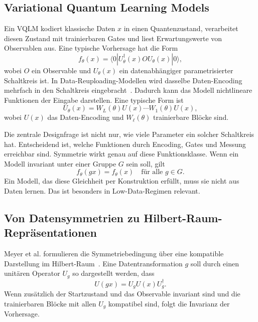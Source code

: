\subsection{Variational Quantum Learning Models}\label{subsec:vqlm}

Ein VQLM kodiert klassische Daten $x$ in einen Quantenzustand, verarbeitet diesen Zustand mit trainierbaren Gates und liest Erwartungswerte von Observablen aus. Eine typische Vorhersage hat die Form
\begin{equation}
f_\theta(x)=
\langle 0|U^\dagger_\theta(x) O U_\theta(x)|0\rangle,
\label{eq:vqlm}
\end{equation}
wobei $O$ ein Observable und $U_\theta(x)$ ein datenabhängiger parametrisierter Schaltkreis ist. In Data-Reuploading-Modellen wird dasselbe Daten-Encoding mehrfach in den Schaltkreis eingebracht~\cite{perez2020data}. Dadurch kann das Modell nichtlineare Funktionen der Eingabe darstellen. Eine typische Form ist
\begin{equation}
U_\theta(x)=W_L(\theta)U(x)\cdots W_1(\theta)U(x),
\label{eq:reuploading}
\end{equation}
wobei $U(x)$ das Daten-Encoding und $W_\ell(\theta)$ trainierbare Blöcke sind.

Die zentrale Designfrage ist nicht nur, wie viele Parameter ein solcher Schaltkreis hat. Entscheidend ist, welche Funktionen durch Encoding, Gates und Messung erreichbar sind. Symmetrie wirkt genau auf diese Funktionsklasse. Wenn ein Modell invariant unter einer Gruppe $G$ sein soll, gilt
\begin{equation}
f_\theta(gx)=f_\theta(x)
\quad\text{für alle }g\in G.
\label{eq:invariance}
\end{equation}
Ein Modell, das diese Gleichheit per Konstruktion erfüllt, muss sie nicht aus Daten lernen. Das ist besonders in Low-Data-Regimen relevant.

\subsection{Von Datensymmetrien zu Hilbert-Raum-Repräsentationen}\label{subsec:repr}

Meyer et al. formulieren die Symmetriebedingung über eine kompatible Darstellung im Hilbert-Raum~\cite{meyer2022exploiting}. Eine Datentransformation $g$ soll durch einen unitären Operator $U_g$ so dargestellt werden, dass
\begin{equation}
U(gx)=U_g U(x) U_g^\dagger.
\label{eq:encoding-equivariance}
\end{equation}
Wenn zusätzlich der Startzustand und das Observable invariant sind und die trainierbaren Blöcke mit allen $U_g$ kompatibel sind, folgt die Invarianz der Vorhersage.

